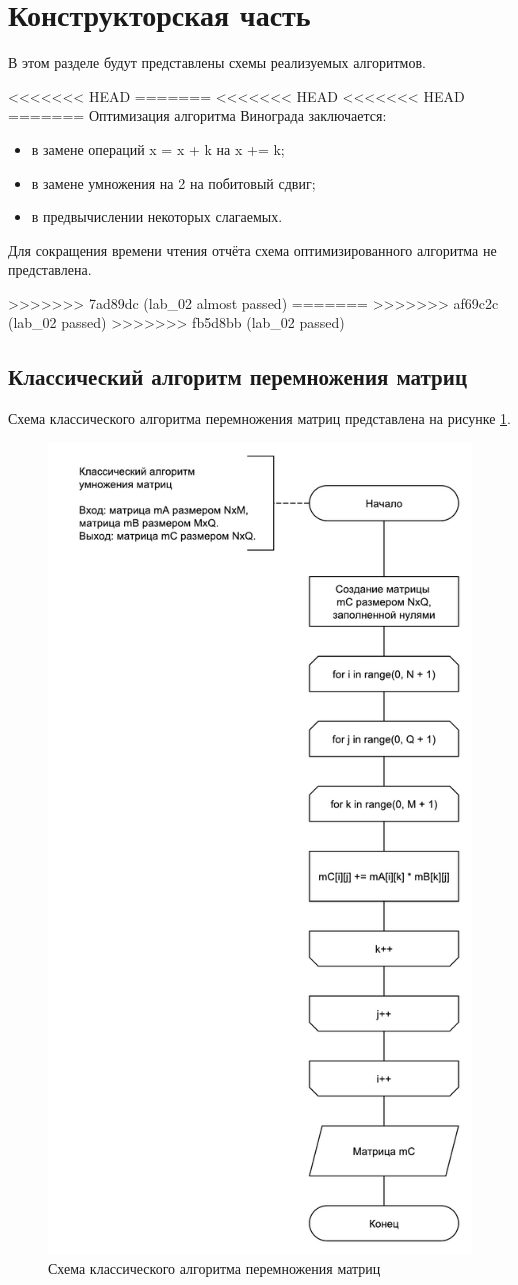 \section{Конструкторская часть}

В этом разделе будут представлены схемы реализуемых алгоритмов.

<<<<<<< HEAD
=======
<<<<<<< HEAD
<<<<<<< HEAD
=======
Оптимизация алгоритма Винограда заключается:
\begin{itemize}
	\item в замене операций x = x + k на x += k;
	\item в замене умножения на 2 на побитовый сдвиг;
	\item в предвычислении некоторых слагаемых.
\end{itemize}

Для сокращения времени чтения отчёта схема оптимизированного алгоритма не представлена.

>>>>>>> 7ad89dc (lab_02 almost passed)
=======
>>>>>>> af69c2c (lab_02 passed)
>>>>>>> fb5d8bb (lab_02 passed)
\newpage

\subsection{Классический алгоритм перемножения матриц}

Схема классического алгоритма перемножения матриц представлена на рисунке \ref{fig:classic}.
\begin{figure}
	\centering
	\includegraphics[width=0.6\linewidth]{images/classic}
	\caption{Схема классического алгоритма перемножения матриц}
	\label{fig:classic}
\end{figure}

